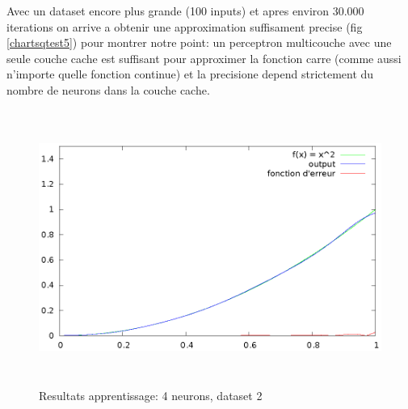 \documentclass[twoside,openright,a4paper,11pt,french]{article}
\begin{document}
Avec un dataset encore plus grande (100 inputs) et apres environ
30.000 iterations on arrive a obtenir une approximation suffisament
precise (fig \ref{chartsqtest5}) pour montrer notre point:
un perceptron multicouche avec une seule couche cache est suffisant pour
approximer la fonction carre (comme aussi n'importe quelle fonction continue) 
et la precisione depend strictement du nombre de neurons dans la couche cache.

\begin{figure}[ht]
\centering
\includegraphics[width=12cm,height=9cm]{./pics/chartsqtest5.eps}
\caption{Resultats apprentissage: 4 neurons, dataset 2}
\label{fig:chartsqtest5}
\end{figure}


\clearpage
{}


\end{document}
